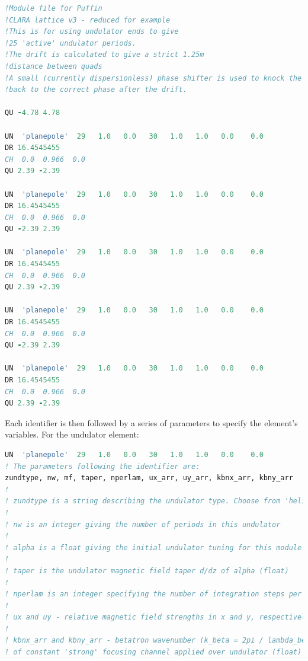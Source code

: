 \documentclass[12pt]{article}%
\begin{document}
\lstset{style=mystyle}
\begin{lstlisting}[language=fortran, caption=Example lattice file.]
!Module file for Puffin
!CLARA lattice v3 - reduced for example
!This is for using undulator ends to give
!25 'active' undulator periods.
!The drift is calculated to give a strict 1.25m
!distance between quads
!A small (currently dispersionless) phase shifter is used to knock the beam
!back to the correct phase after the drift.

QU -4.78 4.78

UN  'planepole'  29   1.0   0.0   30   1.0   1.0   0.0    0.0
DR 16.4545455
CH  0.0  0.966  0.0
QU 2.39 -2.39

UN  'planepole'  29   1.0   0.0   30   1.0   1.0   0.0    0.0
DR 16.4545455
CH  0.0  0.966  0.0
QU -2.39 2.39

UN  'planepole'  29   1.0   0.0   30   1.0   1.0   0.0    0.0
DR 16.4545455
CH  0.0  0.966  0.0
QU 2.39 -2.39

UN  'planepole'  29   1.0   0.0   30   1.0   1.0   0.0    0.0
DR 16.4545455
CH  0.0  0.966  0.0
QU -2.39 2.39

UN  'planepole'  29   1.0   0.0   30   1.0   1.0   0.0    0.0
DR 16.4545455
CH  0.0  0.966  0.0
QU 2.39 -2.39

\end{lstlisting}

Each identifier is then followed by a series of parameters to specify the element's variables. For the undulator element:

\begin{lstlisting}[language=fortran, caption=Undulator identifier and specification]
UN  'planepole'  29   1.0   0.0   30   1.0   1.0   0.0    0.0
! The parameters following the identifier are:
zundtype, nw, mf, taper, nperlam, ux_arr, uy_arr, kbnx_arr, kbny_arr
!
! zundtype is a string describing the undulator type. Choose from 'helical', 'planepole', 'curved', or '' (blank string)
!
! nw is an integer giving the number of periods in this undulator
!
! alpha is a float giving the initial undulator tuning for this module aw/aw0,
!
! taper is the undulator magnetic field taper d/dz of alpha (float)
!
! nperlam is an integer specifying the number of integration steps per undulator period to be used in this undulator
!
! ux and uy - relative magnetic field strengths in x and y, respectively (float)
!
! kbnx_arr and kbny_arr - betatron wavenumber (k_beta = 2pi / lambda_beta)
! of constant 'strong' focusing channel applied over undulator (float)
\end{lstlisting}
\end{document}
